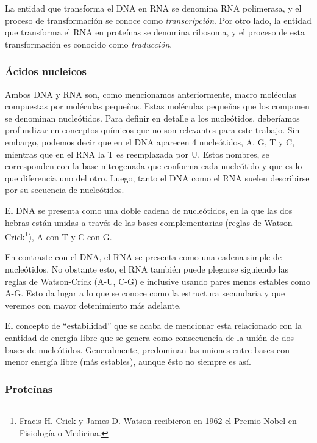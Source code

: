 La entidad que transforma el \ac{DNA} en \ac{RNA} se denomina \ac{RNA}
polimerasa, y el proceso de transformaci\'on se conoce como
\textit{transcripci\'on}. Por otro lado, la entidad que transforma el
\ac{RNA} en prote\'inas se denomina ribosoma, y el proceso de esta
transformaci\'on es conocido como \textit{traducci\'on}.

\subsubsection{\'Acidos nucleicos}

Ambos \ac{DNA} y \ac{RNA} son, como mencionamos anteriormente, macro mol\'eculas
compuestas por mol\'eculas peque\~nas. Estas mol\'eculas peque\~nas que los
componen se denominan nucle\'otidos. Para definir en detalle a los
nucle\'otidos, deber\'iamos profundizar en conceptos qu\'imicos que no son
relevantes para este trabajo. Sin embargo, podemos decir que en el \ac{DNA}
aparecen 4 nucle\'otidos, \ac{A}, \ac{G}, \ac{T} y \ac{C}, mientras que en el
\ac{RNA} la \ac{T} es reemplazada por \ac{U}. Estos nombres, se corresponden
con la base nitrogenada que conforma cada nucle\'otido y que es lo que
diferencia uno del otro. Luego, tanto el \ac{DNA} como el \ac{RNA} suelen
describirse por su secuencia de nucle\'otidos.

El \ac{DNA} se presenta como una doble cadena de nucle\'otidos, en la que las
dos hebras est\'an unidas a trav\'es de las bases complementarias (reglas de
Watson-Crick\footnote{Fracis H. Crick y James D. Watson recibieron en 1962 el
Premio Nobel en Fisiolog\'ia o Medicina.}), \ac{A} con \ac{T} y \ac{C} con
\ac{G}.

En contraste con el \ac{DNA}, el \ac{RNA} se presenta como una cadena simple de
nucle\'otidos. No obstante esto, el \ac{RNA} tambi\'en puede plegarse siguiendo
las reglas de Watson-Crick (\ac{A}-\ac{U}, \ac{C}-\ac{G}) e inclusive usando
pares menos estables como \ac{A}-\ac{G}. Esto da lugar a lo que se conoce
como la estructura secundaria y que veremos con mayor detenimiento m\'as
adelante.

El concepto de ``estabilidad'' que se acaba de mencionar esta relacionado con
la cantidad de energ\'ia libre que se genera como consecuencia de la uni\'on de
dos bases de nucle\'otidos. Generalmente, predominan las uniones entre bases con
menor energ\'ia libre (m\'as estables), aunque \'esto no siempre es as\'i.

\subsubsection{Prote\'inas}

